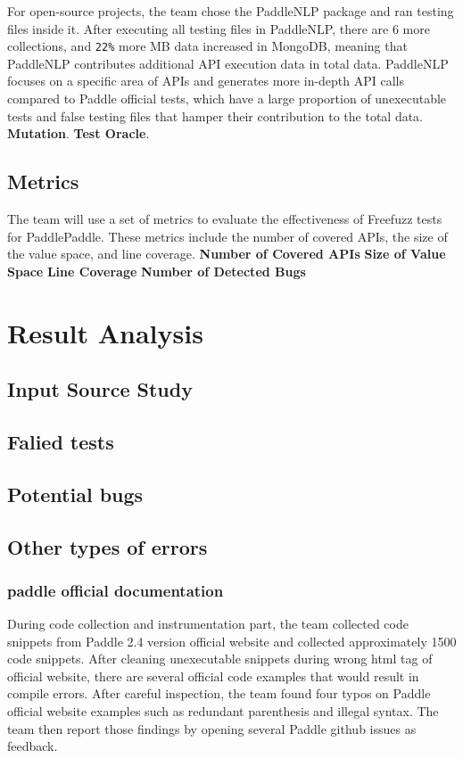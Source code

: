 \documentclass[sigconf]{acmart}
\begin{document}
  \par For open-source projects, the team chose the PaddleNLP package and ran testing files inside it. After executing all testing files in PaddleNLP, there are 6 more collections, and \verb|22%| more MB data increased in MongoDB, 
  meaning that PaddleNLP contributes additional API execution data in total data. PaddleNLP focuses on a specific area of APIs and generates more in-depth API calls compared to Paddle official tests, 
  which have a large proportion of unexecutable tests and false testing files that hamper their contribution to the total data.
  \newline \textbf{Mutation}.
  \newline \textbf{Test Oracle}.
  
  \subsection{Metrics}
  The team will use a set of metrics to evaluate the effectiveness of Freefuzz tests for PaddlePaddle. 
  These metrics include the number of covered APIs, the size of the value space, and line coverage.
  \textbf{Number of Covered APIs}
  \newline \textbf{Size of Value Space}
  \newline \textbf{Line Coverage}
  \newline \textbf{Number of Detected Bugs}

  \section{Result Analysis}
  \subsection{Input Source Study}
  \subsection{Falied tests}
  \subsection{Potential bugs}
  \subsection{Other types of errors}
  \subsubsection{paddle official documentation}
  During code collection and instrumentation part, the team collected code snippets from Paddle 2.4 version 
  official website and collected approximately 1500 code snippets. After cleaning unexecutable snippets during wrong 
  html tag of official website, there are several official code examples that would result in compile errors. After careful inspection,
   the team found four typos on Paddle official website examples such as redundant parenthesis and illegal syntax. 
   The team then report those findings by opening several Paddle github issues as feedback.
\end{document}
